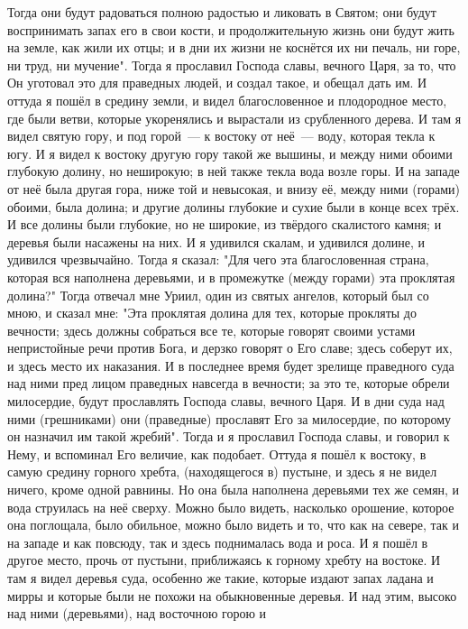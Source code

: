 Тогда они будут радоваться полною радостью и ликовать в Святом; они
будут воспринимать запах его в свои кости, и продолжительную жизнь они будут
жить на земле, как жили их отцы; и в дни их жизни не коснётся их ни печаль, ни
горе, ни труд, ни мучение".
Тогда я прославил Господа славы, вечного Царя, за то, что Он уготовал
это для праведных людей, и создал такое, и обещал дать им.
И оттуда я пошёл в средину земли, и видел благословенное и
плодородное место, где были ветви, которые укоренялись и вырастали из
срубленного дерева.
И там я видел святую гору, и под горой~--- к востоку от неё~--- воду,
которая текла к югу.
И я видел к востоку другую гору такой же вышины, и между ними обоими
глубокую долину, но неширокую; в ней также текла вода возле горы.
И на западе от неё была другая гора, ниже той и невысокая, и внизу
её, между ними (горами) обоими, была долина; и другие долины глубокие и сухие
были в конце всех трёх.
И все долины были глубокие, но не широкие, из твёрдого скалистого
камня; и деревья были насажены на них.
И я удивился скалам, и удивился долине, и удивился чрезвычайно.
Тогда я сказал: "Для чего эта благословенная страна, которая
вся наполнена деревьями, и в промежутке (между горами) эта проклятая долина?"
Тогда отвечал мне Уриил, один из святых ангелов, который был со мною,
и сказал мне: "Эта проклятая долина для тех, которые прокляты до вечности;
здесь должны собраться все те, которые говорят своими устами непристойные речи
против Бога, и дерзко говорят о Его славе; здесь соберут их, и здесь место их
наказания.
И в последнее время будет зрелище праведного суда над ними пред лицом
праведных навсегда в вечности; за это те, которые обрели милосердие, будут
прославлять Господа славы, вечного Царя.
И в дни суда над ними (грешниками) они (праведные) прославят Его за
милосердие, по которому он назначил им такой жребий".
Тогда и я прославил Господа славы, и говорил к Нему, и вспоминал Его
величие, как подобает.
Оттуда я пошёл к востоку, в самую средину горного хребта,
(находящегося в) пустыне, и здесь я не видел ничего, кроме одной равнины.
Но она была наполнена деревьями тех же семян, и вода струилась на неё
сверху.
Можно было видеть, насколько орошение, которое она поглощала, было
обильное, можно было видеть и то, что как на севере, так и на западе и как
повсюду, так и здесь поднималась вода и роса.
И я пошёл в другое место, прочь от пустыни, приближаясь к
горному хребту на востоке.
И там я видел деревья суда, особенно же такие, которые издают запах
ладана и мирры и которые были не похожи на обыкновенные деревья.
И над этим, высоко над ними (деревьями), над восточною горою и
